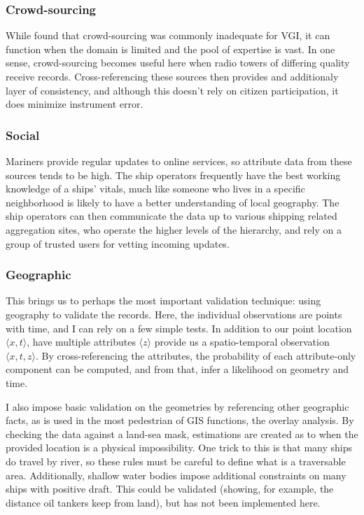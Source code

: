 \documentclass[12pt,letterpaper]{article}
\begin{document}
\subsubsection{Crowd-sourcing}
While \cite{goodchildli2012} found that crowd-sourcing was commonly inadequate for VGI, it can function when the domain is limited and the pool of expertise is vast. In one sense, crowd-sourcing becomes useful here when radio towers of differing quality receive records. Cross-referencing these sources then provides and additionaly layer of consistency, and although this doesn't rely on citizen participation, it does minimize instrument error.

\subsubsection{Social}
Mariners provide regular updates to online services, so attribute data from these sources tends to be high. The ship operators frequently have the best working knowledge of a ships' vitals, much like someone who lives in a specific neighborhood is likely to have a better understanding of local geography. The ship operators can then communicate the data up to various shipping related aggregation sites, who operate the higher levels of the hierarchy, and rely on a group of trusted users for vetting incoming updates.

\subsubsection{Geographic}
This brings us to perhaps the most important validation technique: using geography to validate the records. Here, the individual observations are points with time, and I can rely on a few simple tests.  In addition to our point location $\langle x,t \rangle$, have multiple attributes $\langle z \rangle$ provide us a spatio-temporal observation $\langle x,t,z \rangle$. By cross-referencing the attributes, the probability of each attribute-only component can be computed, and from that, infer a likelihood on geometry and time.

I also impose basic validation on the geometries by referencing other geographic facts, as is used in the most pedestrian of GIS functions, the overlay analysis. By checking the data against a land-sea mask, estimations are created as to when the provided location is a physical impossibility. One trick to this is that many ships do travel by river, so these rules must be careful to define what is a traversable area. Additionally, shallow water bodies impose additional constraints on many ships with positive draft. This could be validated (showing, for example, the distance oil tankers keep from land), but has not been implemented here.
\end{document}
